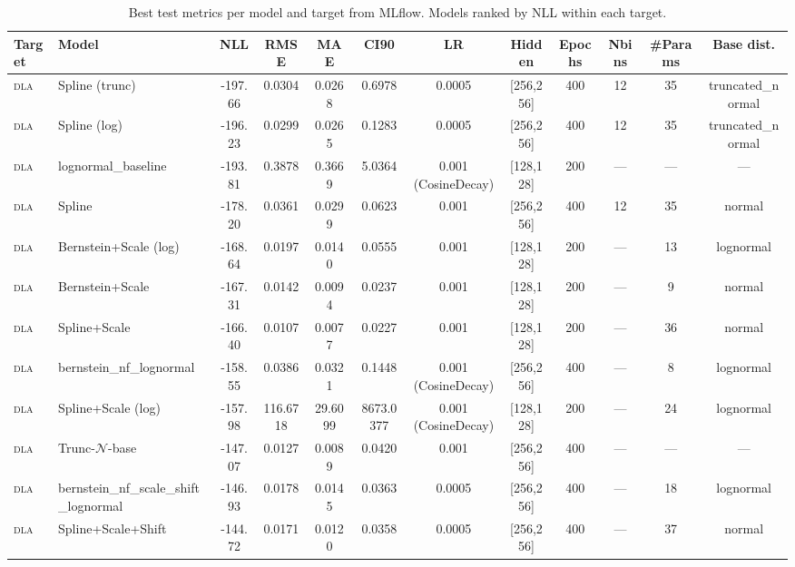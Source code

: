 \begin{table}[htbp]
\caption{Best test metrics per model and target from MLflow. Models ranked by NLL within each target.}
\label{tab:hpo_best_per_model}
\begin{tabular}{llS[table-format=-4.2]S[table-format=-4.2]S[table-format=-1.4]S[table-format=-1.4]cccccc}
\toprule
Target & Model & NLL & RMSE & MAE & CI90 & LR & Hidden & Epochs & Nbins & \#Params & Base dist. \\
\midrule
\textsc{dla} & Spline (trunc) & -197.66 & 0.0304 & 0.0268 & 0.6978 & 0.0005 & [256,256] & 400 & 12 & 35 & truncated_normal \\
\textsc{dla} & Spline (log) & -196.23 & 0.0299 & 0.0265 & 0.1283 & 0.0005 & [256,256] & 400 & 12 & 35 & truncated_normal \\
\textsc{dla} & lognormal_baseline & -193.81 & 0.3878 & 0.3669 & 5.0364 & 0.001 (CosineDecay) & [128,128] & 200 & — & — & — \\
\textsc{dla} & Spline & -178.20 & 0.0361 & 0.0299 & 0.0623 & 0.001 & [256,256] & 400 & 12 & 35 & normal \\
\textsc{dla} & Bernstein+Scale (log) & -168.64 & 0.0197 & 0.0140 & 0.0555 & 0.001 & [128,128] & 200 & — & 13 & lognormal \\
\textsc{dla} & Bernstein+Scale & -167.31 & 0.0142 & 0.0094 & 0.0237 & 0.001 & [128,128] & 200 & — & 9 & normal \\
\textsc{dla} & Spline+Scale & -166.40 & 0.0107 & 0.0077 & 0.0227 & 0.001 & [128,128] & 200 & — & 36 & normal \\
\textsc{dla} & bernstein_nf_lognormal & -158.55 & 0.0386 & 0.0321 & 0.1448 & 0.001 (CosineDecay) & [256,256] & 400 & — & 8 & lognormal \\
\textsc{dla} & Spline+Scale (log) & -157.98 & 116.6718 & 29.6099 & 8673.0377 & 0.001 (CosineDecay) & [128,128] & 200 & — & 24 & lognormal \\
\textsc{dla} & Trunc-$\mathcal{N}$-base & -147.07 & 0.0127 & 0.0089 & 0.0420 & 0.001 & [256,256] & 400 & — & — & — \\
\textsc{dla} & bernstein_nf_scale_shift_lognormal & -146.93 & 0.0178 & 0.0145 & 0.0363 & 0.0005 & [256,256] & 400 & — & 18 & lognormal \\
\textsc{dla} & Spline+Scale+Shift & -144.72 & 0.0171 & 0.0120 & 0.0358 & 0.0005 & [256,256] & 400 & — & 37 & normal \\

\end{tabular}
\end{table}
